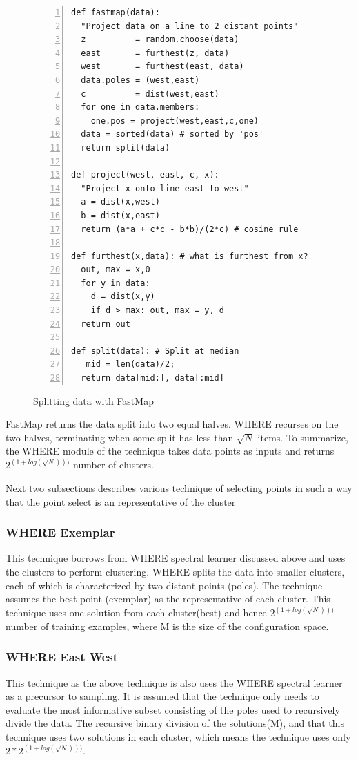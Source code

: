 \documentclass{sig-alternative}
\begin{document}
\begin{figure}[!t] 
\begin{minipage}{3.2in}
\begin{lstlisting}[mathescape,frame=l,numbers=left]
def fastmap(data): 
  "Project data on a line to 2 distant points"
  z          = random.choose(data)
  east       = furthest(z, data)
  west       = furthest(east, data)
  data.poles = (west,east)
  c          = dist(west,east)     
  for one in data.members: 
    one.pos = project(west,east,c,one)
  data = sorted(data) # sorted by 'pos'
  return split(data)

def project(west, east, c, x): 
  "Project x onto line east to west"
  a = dist(x,west)
  b = dist(x,east)
  return (a*a + c*c - b*b)/(2*c) # cosine rule

def furthest(x,data): # what is furthest from x?
  out, max = x,0
  for y in data:
    d = dist(x,y)
    if d > max: out, max = y, d
  return out

def split(data): # Split at median
   mid = len(data)/2; 
  return data[mid:], data[:mid]
\end{lstlisting}
\caption{Splitting data with FastMap}
\label{fig:fastmapCode}  
\end{minipage}
\end{figure}

FastMap returns the data split into two equal halves.
WHERE recurses on the two halves, terminating when some split has less than $\sqrt{N}$ items. To summarize, the WHERE module of the technique takes data points as inputs and returns $2^{(1+log(\sqrt{N})))}$ number of clusters.

Next two subsections describes various technique of selecting points in such a way that the point select is an representative of the cluster

\subsubsection{WHERE Exemplar}\label{where_exemplar}
This technique borrows from WHERE spectral learner discussed above and uses the clusters to perform clustering. WHERE splits the data into smaller clusters, each of which is characterized by two distant points (poles). 
 The technique assumes the best point (exemplar) as the representative of each cluster. This technique uses one solution from each cluster(best) and hence $2^{(1+log(\sqrt{N})))}$ number of training examples, where M is the size of the configuration space.

\subsubsection{WHERE East West}\label{where_east_west}
This technique as the above technique is also uses the WHERE spectral learner as a precursor to sampling. 
It is assumed  that the technique only needs to evaluate
the most informative subset consisting of the poles used to
recursively divide the data. The recursive binary division of the solutions(M), and that this technique uses two solutions in each cluster, which means the technique uses only $2*2^{(1+log(\sqrt{N})))}$.
\end{document}
